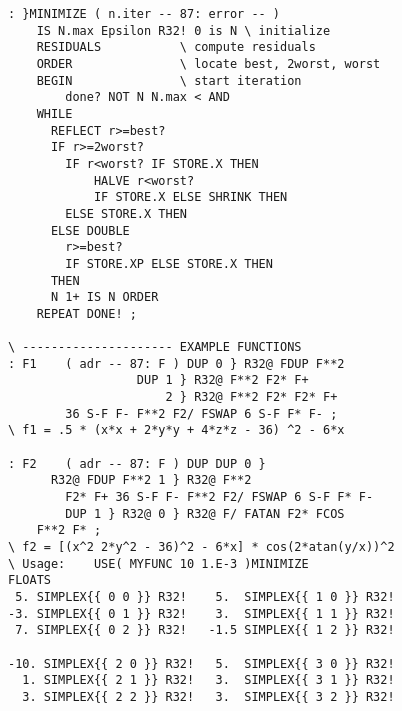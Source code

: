 \begin{lstlisting}
: }MINIMIZE ( n.iter -- 87: error -- )
    IS N.max Epsilon R32! 0 is N \ initialize
    RESIDUALS           \ compute residuals
    ORDER               \ locate best, 2worst, worst
    BEGIN               \ start iteration
        done? NOT N N.max < AND
    WHILE
      REFLECT r>=best?
      IF r>=2worst?
        IF r<worst? IF STORE.X THEN
            HALVE r<worst?
            IF STORE.X ELSE SHRINK THEN
        ELSE STORE.X THEN
      ELSE DOUBLE
        r>=best?
        IF STORE.XP ELSE STORE.X THEN
      THEN
      N 1+ IS N ORDER
    REPEAT DONE! ;

\ --------------------- EXAMPLE FUNCTIONS
: F1    ( adr -- 87: F ) DUP 0 } R32@ FDUP F**2
                  DUP 1 } R32@ F**2 F2* F+
                      2 } R32@ F**2 F2* F2* F+
        36 S-F F- F**2 F2/ FSWAP 6 S-F F* F- ;
\ f1 = .5 * (x*x + 2*y*y + 4*z*z - 36) ^2 - 6*x

: F2    ( adr -- 87: F ) DUP DUP 0 }
      R32@ FDUP F**2 1 } R32@ F**2
        F2* F+ 36 S-F F- F**2 F2/ FSWAP 6 S-F F* F-
        DUP 1 } R32@ 0 } R32@ F/ FATAN F2* FCOS
    F**2 F* ;
\ f2 = [(x^2 2*y^2 - 36)^2 - 6*x] * cos(2*atan(y/x))^2
\ Usage:    USE( MYFUNC 10 1.E-3 )MINIMIZE
FLOATS
 5. SIMPLEX{{ 0 0 }} R32!    5.  SIMPLEX{{ 1 0 }} R32!
-3. SIMPLEX{{ 0 1 }} R32!    3.  SIMPLEX{{ 1 1 }} R32!
 7. SIMPLEX{{ 0 2 }} R32!   -1.5 SIMPLEX{{ 1 2 }} R32!

-10. SIMPLEX{{ 2 0 }} R32!   5.  SIMPLEX{{ 3 0 }} R32!
  1. SIMPLEX{{ 2 1 }} R32!   3.  SIMPLEX{{ 3 1 }} R32!
  3. SIMPLEX{{ 2 2 }} R32!   3.  SIMPLEX{{ 3 2 }} R32!
\end{lstlisting}